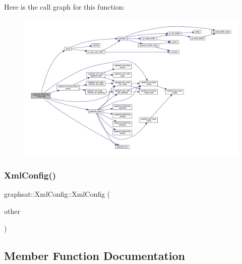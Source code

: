 Here is the call graph for this function\+:
\nopagebreak
\begin{figure}[H]
\begin{center}
\leavevmode
\includegraphics[width=350pt]{classgraphsat_1_1_xml_config_a04abb18c768bc955d4698bcb048e3686_cgraph}
\end{center}
\end{figure}
\mbox{\label{classgraphsat_1_1_xml_config_a6fa611a449d884f2437145b0e5680cd0}} 
\subsubsection{\texorpdfstring{XmlConfig()}{XmlConfig()}\hspace{0.1cm}{\footnotesize\ttfamily [3/3]}}
{\footnotesize\ttfamily graphsat\+::\+Xml\+Config\+::\+Xml\+Config (\begin{DoxyParamCaption}\item[{const \mbox{\hyperlink{classgraphsat_1_1_xml_config}{Xml\+Config}} \&}]{other }\end{DoxyParamCaption})\hspace{0.3cm}{\ttfamily [inline]}}



\subsection{Member Function Documentation}
\mbox{\label{classgraphsat_1_1_xml_config_a41c147d6ae9b486a591f94a24f40cd92}} 

